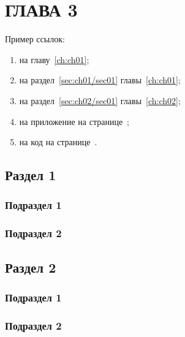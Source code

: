 \chapter{\label{ch:ch03}ГЛАВА 3}

Пример ссылок:
\begin{enumerate}
\item на главу~\ref{ch:ch01};
\item на раздел~\ref{sec:ch01/sec01} главы~\ref{ch:ch01};
\item на раздел~\ref{sec:ch02/sec01} главы~\ref{ch:ch02};
\item на приложение на странице~\pageref{appendix1};
\item на код на странице~\pageref{code:pi-example}.
\end{enumerate}

\section{\label{sec:ch03/sec01}Раздел 1}

\subsection{\label{subsec:ch03/sec01/sub01}Подраздел 1}

\subsection{\label{subsec:ch03/sec01/sub02}Подраздел 2}

\section{\label{sec:ch03/sec02}Раздел 2}

\subsection{\label{subsec:ch03/sec02/sub01}Подраздел 1}

\subsection{\label{subsec:ch03/sec02/sub02}Подраздел 2}


